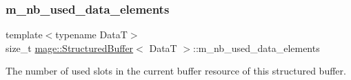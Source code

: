 \subsubsection{\texorpdfstring{m\+\_\+nb\+\_\+used\+\_\+data\+\_\+elements}{m\_nb\_used\_data\_elements}}
{\footnotesize\ttfamily template$<$typename DataT$>$ \\
size\+\_\+t \hyperlink{structmage_1_1_structured_buffer}{mage\+::\+Structured\+Buffer}$<$ DataT $>$\+::m\+\_\+nb\+\_\+used\+\_\+data\+\_\+elements\hspace{0.3cm}{\ttfamily [private]}}

The number of used slots in the current buffer resource of this structured buffer. 